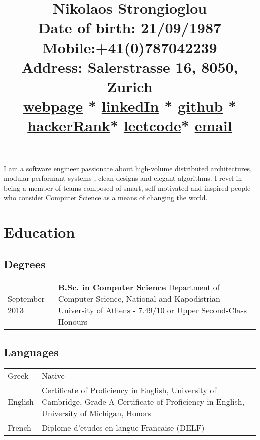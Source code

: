 \documentclass{article}
\begin{document}
	\title{\Huge{\vspace{-3.5cm} \color{NavyBlue}Nikolaos Strongioglou } \\ \small{\textbf{Date of birth}: 21/09/1987\\
			\textbf{Mobile}:+41(0)787042239\\
			\textbf{Address}: Salerstrasse 16, 8050, Zurich\\
			\href{http://tonyflow.github.io/}{webpage} * \href{https://www.linkedin.com/in/nikolaos-strongioglou/}{linkedIn} * \href{https://github.com/tonyflow}{github} * \href{https://www.hackerrank.com/nikostrongioglou}{hackerRank}* \href{https://leetcode.com/nikostr/}{leetcode}* \href{mailto:nikos.strongioglou@gmail.com}{email}
		} }
	\author{}
	\date{}
	\maketitle
	
	\vspace{-1.4cm}
	\noindent
	I am a software engineer passionate about high-volume distributed architectures, modular performant systems , clean designs and elegant algorithms. I revel in being a member of teams composed of smart, self-motivated and inspired people who consider Computer Science as a means of changing the world.

	\section*{\color{NavyBlue} Education}
	\vspace{-0.5cm}
	{\color{NavyBlue} \hrulefill}
	
	\subsection*{Degrees}
	\begin{tabular}{p{2cm}  p{12cm}}
		\small September 2013 & \textbf{B.Sc. in Computer Science} \newline
			Department of Computer Science, National and Kapodistrian University of Athens - 7.49/10 or Upper Second-Class Honours
	\end{tabular}

	\subsection*{Languages}
		\begin{tabular}{p{2cm}  p{12cm}}
			Greek & Native \\
			English & Certificate of Proficiency in English, University of Cambridge, Grade A \newline
							Certificate of Proficiency in English, University of Michigan, Honors \\
			French & Diplome d’etudes en langue Francaise (DELF)
		\end{tabular}
\end{document}
